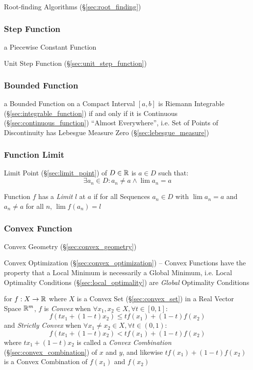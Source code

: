 \fist Root-finding Algorithms (\S\ref{sec:root_finding})



\subsubsection{Step Function}\label{sec:step_function}

a Piecewise Constant Function

Unit Step Function (\S\ref{sec:unit_step_function})



\subsubsection{Bounded Function}\label{sec:bounded_function}

a Bounded Function on a Compact Interval $[a,b]$ is Riemann Integrable
(\S\ref{sec:integrable_function}) if and only if it is Continuous
(\S\ref{sec:continuous_function}) ``Almost Everywhere'', i.e. Set of Points of
Discontinuity has Lebesgue Measure Zero (\S\ref{sec:lebesgue_measure})



\subsubsection{Function Limit}\label{sec:function_limit}

Limit Point (\S\ref{sec:limit_point}) of $D \in \mathbb{R}$ is $a \in D$
such that:
\[
  \exists a_n \in D : a_n \neq a \wedge \lim a_n = a
\]

Function $f$ has a \emph{Limit} $l$ at $a$ if for all Sequences $a_n
\in D$ with $\lim a_n = a$ and $a_n \neq a$ for all $n$, $\lim f(a_n)
= l$



\subsubsection{Convex Function}\label{sec:convex_function}

\fist Convex Geometry (\S\ref{sec:convex_geometry})

\fist Convex Optimization (\S\ref{sec:convex_optimization}) -- Convex Functions
have the property that a Local Minimum is necessarily a Global Minimum, i.e.
Local Optimality Conditions (\S\ref{sec:local_optimality}) are \emph{Global}
Optimality Conditions

for $f : X \rightarrow \mathbb{R}$ where $X$ is a Convex Set
(\S\ref{sec:convex_set}) in a Real Vector Space $\mathbb{R}^m$, $f$ is
\emph{Convex} when $\forall x_1, x_2 \in X, \forall t \in [0,1]$:
\[
  f(tx_1 + (1-t)x_2) \leq tf(x_1) + (1-t)f(x_2)
\]
and \emph{Strictly Convex} when $\forall x_1 \neq x_2 \in X, \forall t \in
(0,1)$:
\[
  f(tx_1 + (1-t)x_2) < tf(x_1) + (1-t)f(x_2)
\]
where $tx_1 + (1-t)x_2$ is called a \emph{Convex Combination}
(\S\ref{sec:convex_combination}) of $x$ and $y$, and likewise $tf(x_1) +
(1-t)f(x_2)$ is a Convex Combination of $f(x_1)$ and $f(x_2)$

